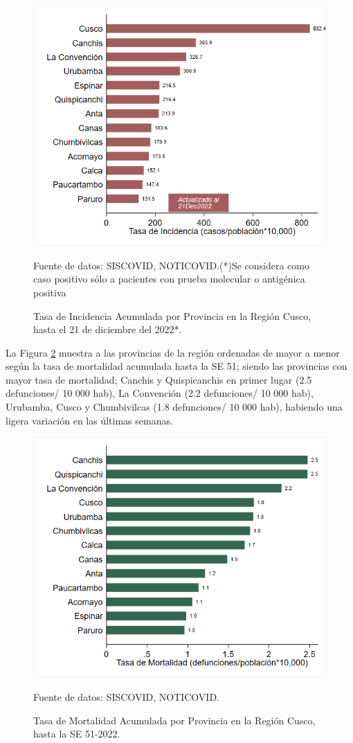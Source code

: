 \documentclass[12pt,a4paper,openany]{book}
\begin{document}
	\begin{figure}[!htpb]
		\caption{Tasa de Incidencia Acumulada por Provincia en la Región Cusco, hasta el 21 de diciembre del 2022*. }\label{fig:incidencia_provincias}
		\begin{center}
			\includegraphics[width=0.60\linewidth]{../figuras/incidencia_provincial_2022.png}
		\end{center}
		{\footnotesize {
				Fuente de datos: SISCOVID, NOTICOVID.(*)Se considera como caso positivo sólo a pacientes con prueba molecular o antigénica positiva}}
	\end{figure}
	
	La Figura \ref{fig:mortalidad_ordenada} muestra a las provincias de la región ordenadas de mayor a menor según la tasa de mortalidad acumulada hasta la SE 51; siendo las provincias con mayor tasa de mortalidad;  Canchis y Quispicanchis en primer lugar (2.5 defunciones/ 10 000 hab), La Convención (2.2 defunciones/ 10 000 hab), Urubamba, Cusco y Chumbivilcas (1.8 defunciones/ 10 000 hab), habiendo una ligera variación en las últimas semanas.
	
	\begin{figure}[h]
		\caption{Tasa de Mortalidad Acumulada por Provincia en la Región Cusco, hasta la SE 51-2022. }\label{fig:mortalidad_ordenada}
		\begin{center}
			\includegraphics[width=0.60\linewidth]{../figuras/mortalidad_provincial_2022.png}
		\end{center}
		{\footnotesize {Fuente de datos: SISCOVID, NOTICOVID.}}
	\end{figure}
	
\end{document}
